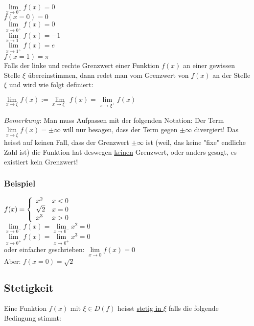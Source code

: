 \documentclass[11pt]{article} %
\begin{document}
$\lim\limits_{x\rightarrow0^-}f(x) = 0$\\
$f(x=0)= 0$\\
$\lim\limits_{x\rightarrow0^+}f(x) = 0$\\
$\lim\limits_{x\rightarrow1^-}f(x) = -1$\\
$\lim\limits_{x\rightarrow1^+}f(x) = e$\\
$f(x=1)= \pi$\\


Falls der linke und rechte Grenzwert einer Funktion $f(x)$ an einer gewissen Stelle $\xi$ übereinstimmen, dann redet man vom Grenzwert von $f(x)$ an der Stelle $\xi$ und wird wie folgt definiert:\\
\begin{center}
$\lim\limits_{x\rightarrow \xi}f(x) := \lim\limits_{x\rightarrow \xi^-}f(x) = \lim\limits_{x\rightarrow \xi^+}f(x)$
\end{center}

$Bemerkung$: Man muss Aufpassen mit der folgenden Notation: Der Term $\lim\limits_{x\rightarrow \xi}f(x) = \pm\infty$ will nur besagen, dass der Term gegen  $\pm \infty$ divergiert! Das heisst auf keinen Fall, dass der Grenzwert $\pm \infty$ ist (weil, das keine "fixe" endliche Zahl ist) die Funktion hat deswegen \underline{keinen} Grenzwert, oder anders gesagt, es existiert kein Grenzwert!

\subsubsection{Beispiel}
$f(x) = \left \{ 
\begin{array}{l  l}
	x^2 & x<0\\
	\sqrt{2} & x=0\\
	x^3 & x>0\\
\end{array} \right.$ \\

$\lim\limits_{x\rightarrow0^-}f(x) = \lim\limits_{x\rightarrow0^-}x^2=  0$\\
$\lim\limits_{x\rightarrow0^+}f(x) = \lim\limits_{x\rightarrow0^+}x^3 = 0$\\

oder einfacher geschrieben: $\lim\limits_{x\rightarrow0}f(x) = 0$\\
Aber:
$f(x=0)= \sqrt{2}$\\

\subsection{Stetigkeit}
Eine Funktion $f(x)$ mit $\xi \in D(f)$ heisst \underline{stetig in $\xi$} falls die folgende Bedingung stimmt:
\end{document}
